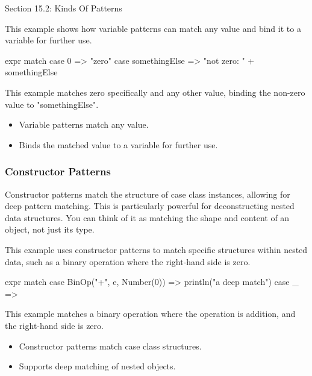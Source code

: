 \begin{notes}{Section 15.2: Kinds Of Patterns}
    \begin{highlight}
    
    This example shows how variable patterns can match any value and bind it to a variable for further use.
    
    \begin{code}[Scala]
    expr match {
        case 0 => "zero"
        case somethingElse => "not zero: " + somethingElse
    }
    \end{code}
    
    This example matches zero specifically and any other value, binding the non-zero value to "somethingElse".
    
    \begin{itemize}
        \item Variable patterns match any value.
        \item Binds the matched value to a variable for further use.
    \end{itemize}
    
    \end{highlight}
    
    \subsubsection*{Constructor Patterns}
    
    Constructor patterns match the structure of case class instances, allowing for deep pattern matching. This is particularly powerful for deconstructing nested data structures. You can think of it 
    as matching the shape and content of an object, not just its type.
    
    \begin{highlight}
    
    This example uses constructor patterns to match specific structures within nested data, such as a binary operation where the right-hand side is zero.
    
    \begin{code}[Scala]
    expr match {
        case BinOp("+", e, Number(0)) => println("a deep match")
        case _ =>
    }
    \end{code}
    
    This example matches a binary operation where the operation is addition, and the right-hand side is zero.
    
    \begin{itemize}
        \item Constructor patterns match case class structures.
        \item Supports deep matching of nested objects.
    \end{itemize}
    

\end{highlight}
\end{notes}
